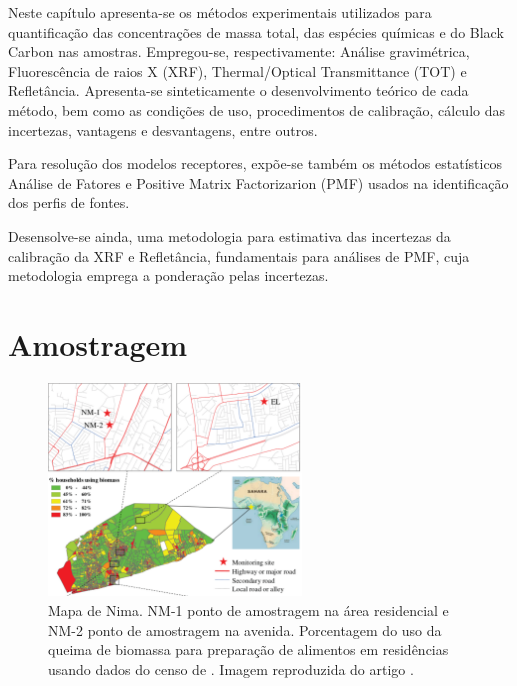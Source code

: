 Neste capítulo apresenta-se os métodos experimentais utilizados para 
quantificação das concentrações de massa total, das espécies químicas e 
do Black Carbon nas amostras. Empregou-se, respectivamente:
Análise gravimétrica, Fluorescência de raios X (XRF),
Thermal/Optical Transmittance (TOT) e Refletância.
Apresenta-se sinteticamente o desenvolvimento teórico de cada método, bem como 
as condições de uso, procedimentos de calibração, cálculo das incertezas, 
vantagens e desvantagens, entre outros.

Para resolução dos modelos receptores, expõe-se também os métodos 
estatísticos Análise de Fatores e Positive Matrix Factorizarion (PMF) 
usados na identificação dos perfis de fontes. 

Desensolve-se ainda, uma metodologia para estimativa das incertezas
da calibração da XRF e Refletância, fundamentais para análises de PMF,
cuja metodologia emprega a ponderação pelas incertezas.

\section{Amostragem}

\begin{figure}[H]
\begin{center}
  \includegraphics[width=0.6\textwidth]{../inputs/images/zheng/nima_mapa.pdf}
  \caption{Mapa de Nima. NM-1 ponto de amostragem na área residencial e 
           NM-2 ponto de amostragem na avenida. Porcentagem do uso da queima
           de biomassa para preparação de alimentos em residências usando dados
           do censo de \citeyearpar{ghanacensus2003}. Imagem reproduzida do 
           artigo \citet{zhou2013}. \label{fig:nima_mapa}}
\end{center}
\end{figure}

